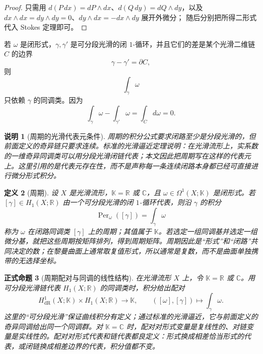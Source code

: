 \documentclass[UTF8,fontset=none,a4paper,11pt]{ctexart}
\theoremstyle{foundation-definition}
\newtheorem{definition}{定义}[section]
\theoremstyle{foundation-theorem}
\theoremstyle{foundation-proposition}
\newtheorem{proposition}[definition]{正式命题}
\theoremstyle{foundation-example}
\theoremstyle{foundation-remark}
\newtheorem{remark}[definition]{说明}
\theoremstyle{foundation-theorem}
\begin{document}
\begin{proof}
只需用 \(d(P\,dx)=dP\wedge dx\)、\(d(Q\,dy)=dQ\wedge dy\)，以及
\(dx\wedge dx=dy\wedge dy=0\)、\(dy\wedge dx=-dx\wedge dy\) 展开外微分；
随后分别把所得二形式代入 Stokes 定理即可。
\end{proof}

若 \(\omega\) 是闭形式，\(\gamma,\gamma'\) 是可分段光滑的闭 \(1\)-循环，并且它们的差是某个光滑二维链 \(C\) 的边界
\[
\gamma-\gamma'=\partial C,
\]
则
\[
\int_\gamma\omega
\]
只依赖 \(\gamma\) 的同调类。因为
\[
\int_\gamma\omega-\int_{\gamma'}\omega
=\int_Cd\omega=0.
\]

\begin{remark}[周期的光滑代表元条件]\label{rem:period-smooth-representatives}
周期的积分公式要求闭路至少是分段光滑的，但前面定义的奇异链只要求连续。标准的光滑逼近定理说明：在光滑流形上，实系数的一维奇异同调类可以用分段光滑闭链代表；本文因此把周期写在这样的代表元上。这里引用的是代表元存在性，而不是声称每一条连续闭路本身都已经可直接进行微分形式积分。
\end{remark}

\begin{definition}[周期]\label{def:period}
设 \(X\) 是光滑流形，\(\mathbb K=\mathbb R\) 或 \(\mathbb C\)，且
\(\omega\in\Omega^1(X;\mathbb K)\) 是闭形式。若
\([\gamma]\in H_1(X;\mathbb R)\) 由一个可分段光滑的闭 \(1\)-循环代表，则沿 \(\gamma\) 的积分
\[
\operatorname{Per}_{\omega}([\gamma])=\int_\gamma\omega
\]
称为 \(\omega\) 在闭路同调类 \([\gamma]\) 上的周期；其值属于 \(\mathbb K\)。若选定一组同调基并选定一组微分基，就把这些周期按矩阵排列，得到周期矩阵。周期因此是“形式”和“闭路”共同决定的数；在黎曼曲面上通常取复值形式，所以通常是复数，而不是曲面单独携带的无选择坐标。
\end{definition}

\begin{proposition}[周期配对与同调的线性结构]\label{prop:period-pairing}
在光滑流形 \(X\) 上，令 \(\mathbb K=\mathbb R\) 或 \(\mathbb C\)。用可分段光滑链代表
\(H_1(X;\mathbb R)\) 的同调类时，积分给出配对
\[
H^1_{\mathrm{dR}}(X;\mathbb K)\times H_1(X;\mathbb R)
\longrightarrow\mathbb K,\qquad
([\omega],[\gamma])\longmapsto\int_\gamma\omega.
\]
这里的“可分段光滑”保证曲线积分有定义；通过标准的光滑逼近，它与前面定义的奇异同调给出同一个同调群。对 \(\mathbb K=\mathbb C\) 时，配对对形式变量是复线性的、对链变量是实线性的。配对对形式代表和链代表都良定义：形式换成相差恰当形式的代表，或闭链换成相差边界的代表，积分值都不变。
\end{proposition}
\end{document}
